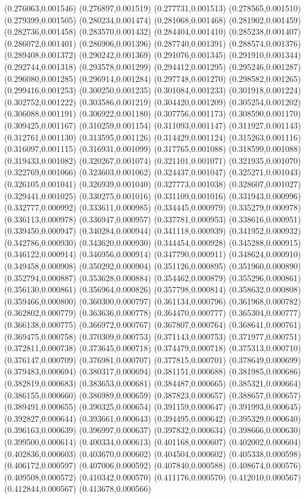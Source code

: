 {(0.276063,0.001546) (0.276897,0.001519) (0.277731,0.001513) (0.278565,0.001510) (0.279399,0.001505) (0.280234,0.001474) (0.281068,0.001468) (0.281902,0.001459) (0.282736,0.001458) (0.283570,0.001432) (0.284404,0.001410) (0.285238,0.001407) (0.286072,0.001401) (0.286906,0.001396) (0.287740,0.001391) (0.288574,0.001376) (0.289408,0.001372) (0.290242,0.001369) (0.291076,0.001345) (0.291910,0.001344) (0.292744,0.001318) (0.293578,0.001299) (0.294412,0.001295) (0.295246,0.001287) (0.296080,0.001285) (0.296914,0.001284) (0.297748,0.001270) (0.298582,0.001265) (0.299416,0.001253) (0.300250,0.001235) (0.301084,0.001233) (0.301918,0.001224) (0.302752,0.001222) (0.303586,0.001219) (0.304420,0.001209) (0.305254,0.001202) (0.306088,0.001191) (0.306922,0.001180) (0.307756,0.001173) (0.308590,0.001170) (0.309425,0.001167) (0.310259,0.001154) (0.311093,0.001147) (0.311927,0.001143) (0.312761,0.001130) (0.313595,0.001126) (0.314429,0.001124) (0.315263,0.001116) (0.316097,0.001115) (0.316931,0.001099) (0.317765,0.001088) (0.318599,0.001088) (0.319433,0.001082) (0.320267,0.001074) (0.321101,0.001071) (0.321935,0.001070) (0.322769,0.001066) (0.323603,0.001062) (0.324437,0.001047) (0.325271,0.001043) (0.326105,0.001041) (0.326939,0.001040) (0.327773,0.001038) (0.328607,0.001027) (0.329441,0.001025) (0.330275,0.001016) (0.331109,0.001016) (0.331943,0.000996) (0.332777,0.000992) (0.333611,0.000985) (0.334445,0.000979) (0.335279,0.000978) (0.336113,0.000978) (0.336947,0.000957) (0.337781,0.000953) (0.338616,0.000951) (0.339450,0.000947) (0.340284,0.000944) (0.341118,0.000939) (0.341952,0.000932) (0.342786,0.000930) (0.343620,0.000930) (0.344454,0.000928) (0.345288,0.000915) (0.346122,0.000914) (0.346956,0.000914) (0.347790,0.000911) (0.348624,0.000910) (0.349458,0.000908) (0.350292,0.000904) (0.351126,0.000895) (0.351960,0.000890) (0.352794,0.000887) (0.353628,0.000884) (0.354462,0.000879) (0.355296,0.000861) (0.356130,0.000861) (0.356964,0.000826) (0.357798,0.000814) (0.358632,0.000808) (0.359466,0.000800) (0.360300,0.000797) (0.361134,0.000796) (0.361968,0.000782) (0.362802,0.000779) (0.363636,0.000778) (0.364470,0.000777) (0.365304,0.000777) (0.366138,0.000775) (0.366972,0.000767) (0.367807,0.000764) (0.368641,0.000761) (0.369475,0.000758) (0.370309,0.000753) (0.371143,0.000753) (0.371977,0.000751) (0.372811,0.000738) (0.373645,0.000718) (0.374479,0.000718) (0.375313,0.000710) (0.376147,0.000709) (0.376981,0.000707) (0.377815,0.000701) (0.378649,0.000699) (0.379483,0.000694) (0.380317,0.000694) (0.381151,0.000688) (0.381985,0.000686) (0.382819,0.000683) (0.383653,0.000681) (0.384487,0.000665) (0.385321,0.000664) (0.386155,0.000660) (0.386989,0.000659) (0.387823,0.000657) (0.388657,0.000657) (0.389491,0.000655) (0.390325,0.000654) (0.391159,0.000647) (0.391993,0.000645) (0.392827,0.000644) (0.393661,0.000643) (0.394495,0.000642) (0.395329,0.000640) (0.396163,0.000639) (0.396997,0.000637) (0.397832,0.000634) (0.398666,0.000630) (0.399500,0.000614) (0.400334,0.000613) (0.401168,0.000607) (0.402002,0.000604) (0.402836,0.000603) (0.403670,0.000602) (0.404504,0.000602) (0.405338,0.000598) (0.406172,0.000597) (0.407006,0.000592) (0.407840,0.000588) (0.408674,0.000576) (0.409508,0.000572) (0.410342,0.000570) (0.411176,0.000570) (0.412010,0.000567) (0.412844,0.000567) (0.413678,0.000566) }
